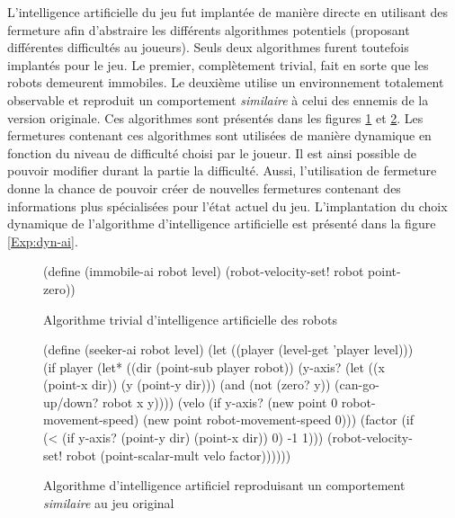 \documentclass[12pt,oneside,letterpaper,francais]{book}
\begin{document}
L'intelligence artificielle du jeu fut implantée de manière directe en
utilisant des fermeture afin d'abstraire les différents algorithmes
potentiels (proposant différentes difficultés au joueurs). Seuls deux
algorithmes furent toutefois implantés pour le jeu. Le premier,
complètement trivial, fait en sorte que les robots demeurent
immobiles.  Le deuxième utilise un environnement totalement observable
et reproduit un comportement \emph{similaire} à celui des ennemis de
la version originale. Ces algorithmes sont présentés dans les figures
\ref{Exp:ai-imm} et \ref{Exp:ai-seek}. Les fermetures contenant ces
algorithmes sont utilisées de manière dynamique en fonction du niveau
de difficulté choisi par le joueur. Il est ainsi possible de pouvoir
modifier durant la partie la difficulté. Aussi, l'utilisation de
fermeture donne la chance de pouvoir créer de nouvelles fermetures
contenant des informations plus spécialisées pour l'état actuel du
jeu. L'implantation du choix dynamique de l'algorithme d'intelligence
artificielle est présenté dans la figure \ref{Exp:dyn-ai}.

\begin{figure}[htb!]
  \begin{schemecode}
(define (immobile-ai robot level)
  (robot-velocity-set! robot point-zero))
  \end{schemecode}
  \caption{Algorithme trivial d'intelligence artificielle des robots}
  \label{Exp:ai-imm}
\end{figure}

\begin{figure}[htb!]
  \begin{schemecode}
(define (seeker-ai robot level)
  (let ((player (level-get 'player level)))
    (if player
        (let* ((dir (point-sub player robot))
               (y-axis? (let ((x (point-x dir)) (y (point-y dir)))
                          (and (not (zero? y))
                               (can-go-up/down? robot x y))))
               (velo (if y-axis?
                         (new point 0 robot-movement-speed)
                         (new point robot-movement-speed 0)))
               (factor (if (< (if y-axis? (point-y dir) (point-x dir)) 0)
                           -1
                           1)))
          (robot-velocity-set! robot (point-scalar-mult velo factor))))))
  \end{schemecode}
  \caption{Algorithme d'intelligence artificiel reproduisant un
    comportement \emph{similaire} au jeu original}
  \label{Exp:ai-seek}
\end{figure}
\end{document}
